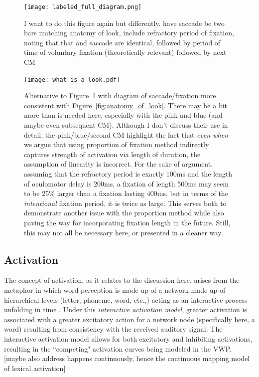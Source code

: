 \begin{figure}
\centering
\texttt{[image: labeled\_full\_diagram.png]}
\caption{I want to do this figure again but differently. have saccade be  two bars matching anatomy of look, include refractory period of fixation, noting that that and saccade are identical, followed by period of time of voluntary fixation (theoretically relevant) followed by next CM}
\label{fig:full_diagram_looks}
\end{figure}

\begin{figure}
\centering
\texttt{[image: what\_is\_a\_look.pdf]}
\caption{Alternative to Figure~\ref{fig:full_diagram_looks} with diagram of saccade/fixation more consistent with Figure~\ref{fig:anatomy_of_look}. There may be a bit more than is needed here, especially with the pink and blue (and maybe even subsequent CM). Although I don't discuss their use in detail, the pink/blue/second CM highlight the fact that \textit{even when} we argue that using proportion of fixation method indirectly captures strength of activation via length of duration, the assumption of linearity is incorrect. For the sake of argument, assuming that the refractory period is exactly 100ms and the length of oculomotor delay is 200ms, a fixation of length 500ms may seem to be 25\% larger than a fixation lasting 400ms, but in terms of the \textit{intentional} fixation period, it is twice as large. This serves both to demonstrate another issue with the proportion method while also paving the way for incorporating fixation length in the future. Still, this may not all be necessary here, or presented in a cleaner way} 
\label{fig:whats_in_a_look}
\end{figure}

\subsection{Activation}

The concept of activation, as it relates to the discussion here, arises from the metaphor in which word perception is made up of a network made up of hierarchical levels (letter, phoneme, word, etc.,) acting as an interactive process unfolding in time \cite{McClelland1981}. Under this \textit{interactive activation model}, greater activation is associated with a greater excitatory action for a network node (specifically here, a word) resulting from consistency with the received auditory signal. The interactive activation model allows for both excitatory and inhibiting activations, resulting in the ``competing" activation curves being modeled in the VWP. [maybe also address happens continuously, hence the continuous mapping model of lexical activation]

